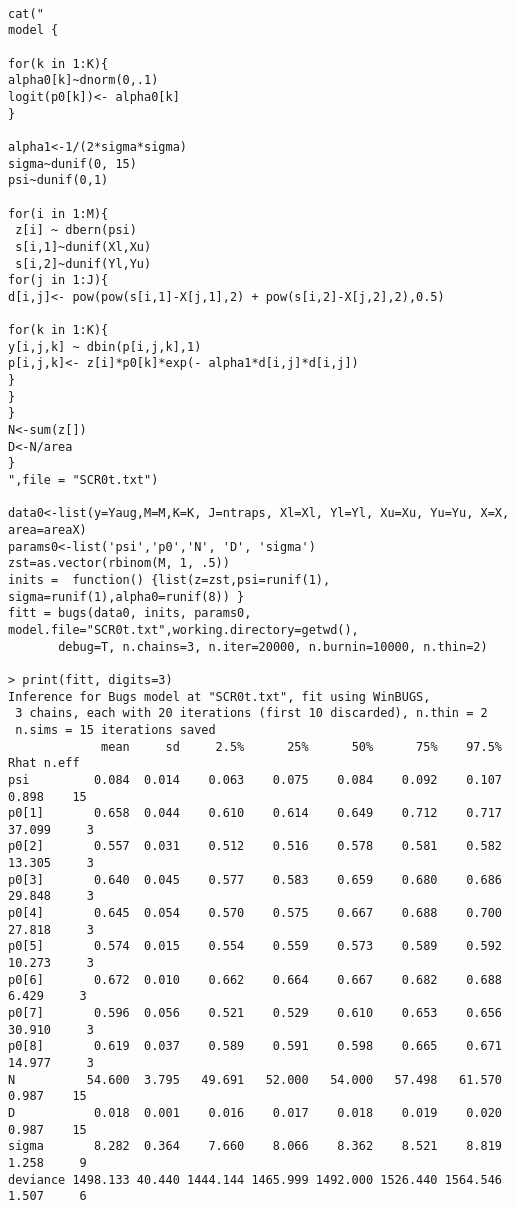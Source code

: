{\small
\begin{verbatim}

cat("
model {

for(k in 1:K){
alpha0[k]~dnorm(0,.1)
logit(p0[k])<- alpha0[k]
}

alpha1<-1/(2*sigma*sigma)
sigma~dunif(0, 15)
psi~dunif(0,1)

for(i in 1:M){
 z[i] ~ dbern(psi)
 s[i,1]~dunif(Xl,Xu)
 s[i,2]~dunif(Yl,Yu)
for(j in 1:J){
d[i,j]<- pow(pow(s[i,1]-X[j,1],2) + pow(s[i,2]-X[j,2],2),0.5)

for(k in 1:K){
y[i,j,k] ~ dbin(p[i,j,k],1)
p[i,j,k]<- z[i]*p0[k]*exp(- alpha1*d[i,j]*d[i,j])
}
}
}
N<-sum(z[])
D<-N/area
}
",file = "SCR0t.txt")

data0<-list(y=Yaug,M=M,K=K, J=ntraps, Xl=Xl, Yl=Yl, Xu=Xu, Yu=Yu, X=X, area=areaX)
params0<-list('psi','p0','N', 'D', 'sigma')
zst=as.vector(rbinom(M, 1, .5))
inits =  function() {list(z=zst,psi=runif(1), sigma=runif(1),alpha0=runif(8)) }
fitt = bugs(data0, inits, params0, model.file="SCR0t.txt",working.directory=getwd(),    
       debug=T, n.chains=3, n.iter=20000, n.burnin=10000, n.thin=2)

> print(fitt, digits=3)
Inference for Bugs model at "SCR0t.txt", fit using WinBUGS,
 3 chains, each with 20 iterations (first 10 discarded), n.thin = 2
 n.sims = 15 iterations saved
             mean     sd     2.5%      25%      50%      75%    97.5%   Rhat n.eff
psi         0.084  0.014    0.063    0.075    0.084    0.092    0.107  0.898    15
p0[1]       0.658  0.044    0.610    0.614    0.649    0.712    0.717 37.099     3
p0[2]       0.557  0.031    0.512    0.516    0.578    0.581    0.582 13.305     3
p0[3]       0.640  0.045    0.577    0.583    0.659    0.680    0.686 29.848     3
p0[4]       0.645  0.054    0.570    0.575    0.667    0.688    0.700 27.818     3
p0[5]       0.574  0.015    0.554    0.559    0.573    0.589    0.592 10.273     3
p0[6]       0.672  0.010    0.662    0.664    0.667    0.682    0.688  6.429     3
p0[7]       0.596  0.056    0.521    0.529    0.610    0.653    0.656 30.910     3
p0[8]       0.619  0.037    0.589    0.591    0.598    0.665    0.671 14.977     3
N          54.600  3.795   49.691   52.000   54.000   57.498   61.570  0.987    15
D           0.018  0.001    0.016    0.017    0.018    0.019    0.020  0.987    15
sigma       8.282  0.364    7.660    8.066    8.362    8.521    8.819  1.258     9
deviance 1498.133 40.440 1444.144 1465.999 1492.000 1526.440 1564.546  1.507     6
\end{verbatim}
}

